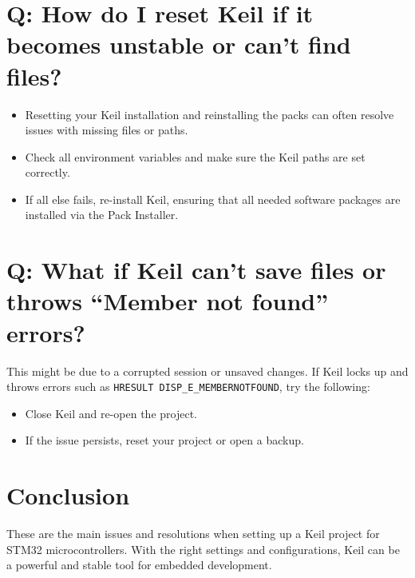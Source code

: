 \documentclass{article}
\begin{document}
\section*{Q: How do I reset Keil if it becomes unstable or can't find files?}

\begin{itemize}
    \item Resetting your Keil installation and reinstalling the packs can often resolve issues with missing files or paths.
    \item Check all environment variables and make sure the Keil paths are set correctly.
    \item If all else fails, re-install Keil, ensuring that all needed software packages are installed via the Pack Installer.
\end{itemize}

\section*{Q: What if Keil can't save files or throws “Member not found” errors?}

This might be due to a corrupted session or unsaved changes. If Keil locks up and throws errors such as \texttt{HRESULT DISP\_E\_MEMBERNOTFOUND}, try the following:
\begin{itemize}
    \item Close Keil and re-open the project.
    \item If the issue persists, reset your project or open a backup.
\end{itemize}

\section*{Conclusion}

These are the main issues and resolutions when setting up a Keil project for STM32 microcontrollers. With the right settings and configurations, Keil can be a powerful and stable tool for embedded development.
\end{document}
